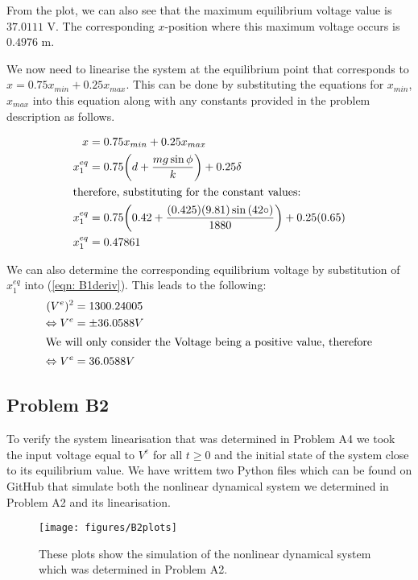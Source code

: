 \documentclass[a4paper,10pt,reqno]{amsart}
\numberwithin{equation}{section}
\begin{document}
From the plot, we can also see that the maximum equilibrium voltage value is $37.0111$ V. The corresponding $x$-position where this maximum voltage occurs is $0.4976$ m.


We now need to linearise the system at the equilibrium point that corresponds to $x=0.75x_{min}+0.25x_{max}$.
This can be done by substituting the equations for $x_{min}$, $x_{max}$ into this equation along with any constants provided in the problem description as follows.

\begin{align}
x &= 0.75x_{min} + 0.25 x_{max}\nonumber \\
x_1^{eq} &= 0.75 \bigg(d + \frac{mg \sin{\phi}}{k}\bigg) + 0.25 \delta \nonumber \\
\intertext{therefore, substituting for the constant values:}
x_1^{eq} &= 0.75 \bigg(0.42 + \frac{(0.425)(9.81) \sin{(42 \circ)}}{1880}\bigg) + 0.25(0.65) \nonumber \\
x_1^{eq} &= 0.47861 \label{eqn: xvalue}
\end{align}

We can also determine the corresponding equilibrium voltage by substitution of $x_1^{eq}$ into (\ref{eqn: B1deriv}).
This leads to the following:
\begin{align}
(V^e)^2 &= 1300.24005 \nonumber \\
\Leftrightarrow V^e &= \pm 36.0588 V \nonumber \\
\intertext{We will only consider the Voltage being a positive value, therefore}
\Leftrightarrow V^e &= 36.0588 V \label{eqn: Ve value}
\end{align}



\subsection{Problem B2}\label{sec:b2}

To verify the system linearisation that was determined in Problem A4 we took the input voltage equal to $V^e$ for all $t \geq 0$ and the initial state of the system close to its equilibrium value. We have writtem two Python files which can be found on GitHub that simulate both the nonlinear dynamical system we determined in Problem A2 and its linearisation.\par


\begin{figure}[h]
\centering
\texttt{[image: figures/B2plots]}
\caption{These plots show the simulation of the nonlinear dynamical system which was determined in Problem A2.}
\label{fig:B2plots}
\end{figure}
\end{document}
